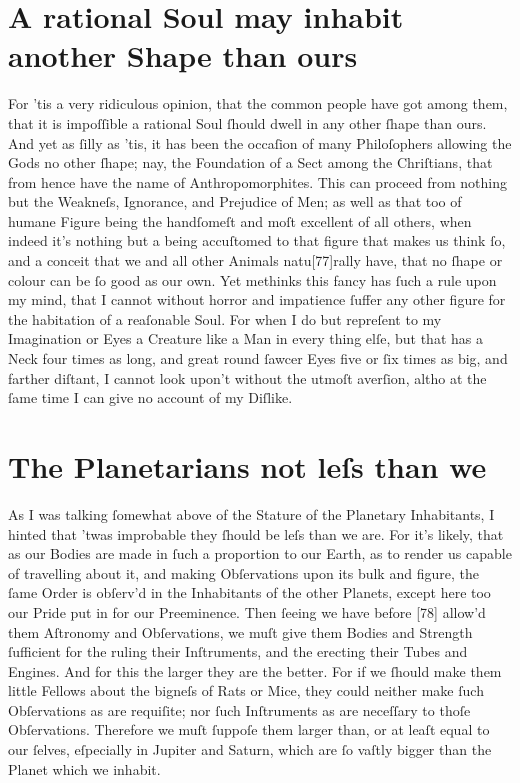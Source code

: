 \documentclass[letterpaper]{book}
\begin{document}
\section{A rational Soul may inhabit another Shape than ours}

For 'tis a very ridiculous opinion, that the common people have got among
them, that it is impoſſible a rational Soul ſhould dwell in any other ſhape
than ours. And yet as ſilly as 'tis, it has been the occaſion of many
Philoſophers allowing the Gods no other ſhape; nay, the Foundation of a
Sect among the Chriſtians, that from hence have the name of
Anthropomorphites. This can proceed from nothing but the Weakneſs,
Ignorance, and Prejudice of Men; as well as that too of humane Figure being
the handſomeſt and moſt excellent of all others, when indeed it's nothing
but a being accuſtomed to that figure that makes us think ſo, and a conceit
that we and all other Animals natu[77]rally have, that no ſhape or colour
can be ſo good as our own. Yet methinks this fancy has ſuch a rule upon my
mind, that I cannot without horror and impatience ſuffer any other figure
for the habitation of a reaſonable Soul. For when I do but repreſent to my
Imagination or Eyes a Creature like a Man in every thing elſe, but that has a
Neck four times as long, and great round ſawcer Eyes five or ſix times as
big, and farther diſtant, I cannot look upon't without the utmoſt averſion,
altho at the ſame time I can give no account of my Diſlike.


\section{The Planetarians not leſs than we}

As I was talking ſomewhat above of the Stature of the Planetary Inhabitants,
I hinted that 'twas improbable they ſhould be leſs than we are. For it's
likely, that as our Bodies are made in ſuch a proportion to our Earth, as to
render us capable of travelling about it, and making Obſervations upon its
bulk and figure, the ſame Order is obſerv'd in the Inhabitants of the other
Planets, except here too our Pride put in for our Preeminence. Then ſeeing
we have before [78] allow'd them Aſtronomy and Obſervations, we muſt
give them Bodies and Strength ſufficient for the ruling their Inſtruments,
and the erecting their Tubes and Engines. And for this the larger they are
the better. For if we ſhould make them little Fellows about the bigneſs of
Rats or Mice, they could neither make ſuch Obſervations as are requiſite;
nor ſuch Inſtruments as are neceſſary to thoſe Obſervations. Therefore we
muſt ſuppoſe them larger than, or at leaſt equal to our ſelves, eſpecially
in Jupiter and Saturn, which are ſo vaſtly bigger than the Planet which we
inhabit.
\end{document}
